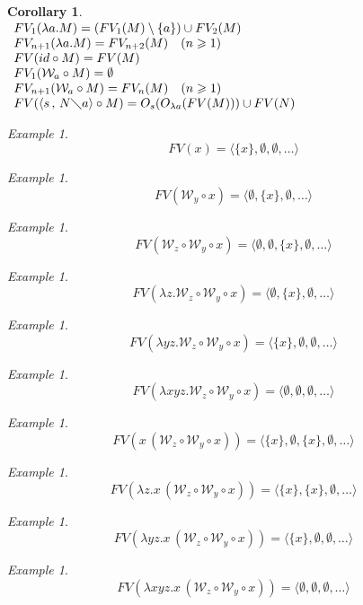 \documentclass[11pt]{amsart}
\theoremstyle{plain}
\newtheorem{corollary}[theorem]{Corollary}
\theoremstyle{definition}
\theoremstyle{remark}
\newtheorem{example}[theorem]{Example}
\numberwithin{equation}{section}
\newcommand{\ci}{\circ}
\newcommand{\mi}{\,,\,}
\newcommand{\is}{\diagdown}
\newcommand{\x}{a}
\renewcommand{\pi}{\mathcal{W}}
\begin{document}
\begin{corollary}$ $\\
 $
\begin{array}{l}
 FV_1(\lambda \x.M)=(FV_1(M)\setminus\{\x\})\cup FV_2(M)\\
 FV_{n+1}(\lambda \x.M)=FV_{n+2}(M)\quad (n\geqslant 1)\\
 FV(id\ci M)= FV(M)\\
 FV_1(\pi_{\x}\ci M)=\emptyset \\
 FV_{n+1}(\pi_{\x}\ci M)= FV_{n}(M)\quad (n\geqslant 1)\\
 FV(\langle s\mi N\is \x\rangle\ci M)= O_s(O_{\lambda
\x}(FV(M)))\cup FV(N)
\end{array}
$
\end{corollary}
\begin{example}
$$FV(x)=\langle\{x\},\emptyset,\emptyset,\ldots\rangle$$
\end{example}
\begin{example}
$$FV(\pi_y\ci x)=\langle\emptyset,\{x\},\emptyset,\ldots\rangle$$
\end{example}
\begin{example}
$$FV(\pi_z\ci\pi_y\ci x)=\langle\emptyset,\emptyset,\{x\},\emptyset,\ldots\rangle$$
\end{example}
\begin{example}
$$FV(\lambda z.\pi_z\ci\pi_y\ci x)=\langle\emptyset,\{x\},\emptyset,\ldots\rangle$$
\end{example}
\begin{example}
$$FV(\lambda y z.\pi_z\ci\pi_y\ci x)=\langle\{x\},\emptyset,\emptyset,\ldots\rangle$$
\end{example}
\begin{example}
$$FV(\lambda x y z.\pi_z\ci\pi_y\ci x)=\langle\emptyset,\emptyset,\emptyset,\ldots\rangle$$
\end{example}
\begin{example}
$$FV(x\,(\pi_z\ci\pi_y\ci x))=\langle\{x\},\emptyset,\{x\},\emptyset,\ldots\rangle$$
\end{example}
\begin{example}
$$FV(\lambda
z.x\,(\pi_z\ci \pi_y\ci
x))=\langle\{x\},\{x\},\emptyset,\ldots\rangle$$
\end{example}
\begin{example}
$$FV(\lambda y z.x\,(\pi_z\ci\pi_y\ci x))=\langle\{x\},\emptyset,\emptyset,\ldots\rangle$$
\end{example}
\begin{example}
$$FV(\lambda x y
z.x\,(\pi_z\ci\pi_y\ci
x))=\langle\emptyset,\emptyset,\emptyset,\ldots\rangle$$
\end{example}
\end{document}

